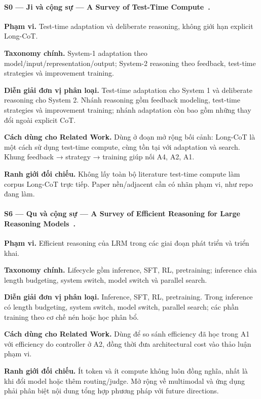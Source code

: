 \paragraph{S0 — Ji và cộng sự — A Survey of Test-Time Compute~\cite{survey_ji2025testtime}.}
\noindent\textbf{Phạm vi.} Test-time adaptation và deliberate reasoning, không giới hạn explicit Long-CoT.\par
\noindent\textbf{Taxonomy chính.} System-1 adaptation theo model/input/representation/output; System-2 reasoning theo feedback, test-time strategies và improvement training.\par
\noindent\textbf{Diễn giải đơn vị phân loại.} Test-time adaptation cho System 1 và deliberate reasoning cho System 2. Nhánh reasoning gồm feedback modeling, test-time strategies và improvement training; nhánh adaptation còn bao gồm những thay đổi ngoài explicit CoT.\par
\noindent\textbf{Cách dùng cho Related Work.} Dùng ở đoạn mở rộng bối cảnh: Long-CoT là một cách sử dụng test-time compute, cùng tồn tại với adaptation và search. Khung feedback → strategy → training giúp nối A4, A2, A1.\par
\noindent\textbf{Ranh giới đối chiếu.} Không lấy toàn bộ literature test-time compute làm corpus Long-CoT trực tiếp. Paper nền/adjacent cần có nhãn phạm vi, như repo đang làm.\par
{}

\paragraph{S6 — Qu và cộng sự — A Survey of Efficient Reasoning for Large Reasoning Models~\cite{survey_qu2025efficient}.}
\noindent\textbf{Phạm vi.} Efficient reasoning của LRM trong các giai đoạn phát triển và triển khai.\par
\noindent\textbf{Taxonomy chính.} Lifecycle gồm inference, SFT, RL, pretraining; inference chia length budgeting, system switch, model switch và parallel search.\par
\noindent\textbf{Diễn giải đơn vị phân loại.} Inference, SFT, RL, pretraining. Trong inference có length budgeting, system switch, model switch, parallel search; các phần training theo cơ chế nén hoặc học phân bổ.\par
\noindent\textbf{Cách dùng cho Related Work.} Dùng để so sánh efficiency đã học trong A1 với efficiency do controller ở A2, đồng thời đưa architectural cost vào thảo luận phạm vi.\par
\noindent\textbf{Ranh giới đối chiếu.} Ít token và ít compute không luôn đồng nghĩa, nhất là khi đổi model hoặc thêm routing/judge. Mở rộng về multimodal và ứng dụng phải phân biệt nội dung tổng hợp phương pháp với future directions.\par
{}

